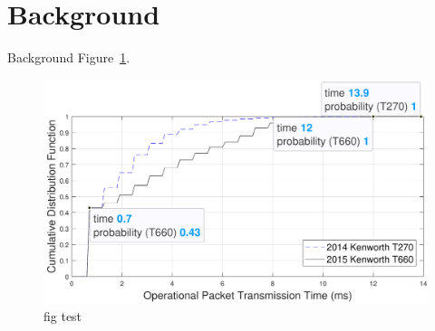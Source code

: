 \section{Background}
\label{s:bg}

Background Figure~\ref{cdf}.

\begin{figure}[h]
  \centering
  \includegraphics[width=1.0\linewidth]{fig/cdf.pdf}
  \caption{fig test}
  \label{cdf}
\end{figure}